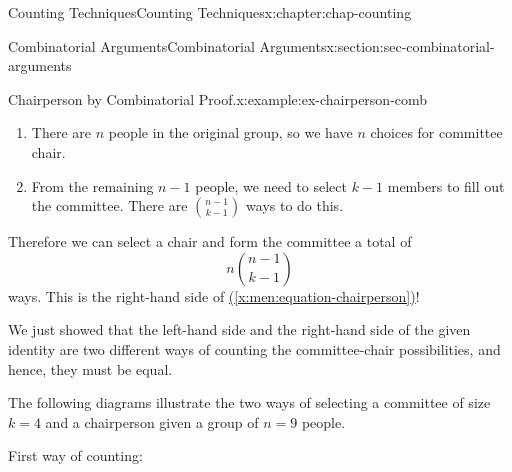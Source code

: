 \documentclass[oneside,10pt,]{book}
\newcommand{\xreffont}{\relax}
\numberwithin{equation}{section}
\begin{document}
\begin{chapterptx}{Counting Techniques}{}{Counting Techniques}{}{}{x:chapter:chap-counting}
\begin{sectionptx}{Combinatorial Arguments}{}{Combinatorial Arguments}{}{}{x:section:sec-combinatorial-arguments}
\begin{example}{Chairperson by Combinatorial Proof.}{x:example:ex-chairperson-comb}
\begin{enumerate}
\item{}There are \(n\) people in the original group, so we have \(n\) choices for committee chair.%
\item{}From the remaining \(n-1\) people, we need to select \(k-1\) members to fill out the committee. There are \(\binom{n-1}{k-1}\) ways to do this.%
\end{enumerate}
Therefore we can select a chair and form the committee a total of%
\begin{equation*}
n\binom{n-1}{k-1}
\end{equation*}
ways. This is the right-hand side of \hyperref[x:men:equation-chairperson]{({\xreffont\ref{x:men:equation-chairperson}})}!%
\par
We just showed that the left-hand side and the right-hand side of the given identity are two different ways of counting the committee-chair possibilities, and hence, they must be equal.%
\end{example}
The following diagrams illustrate the two ways of selecting a committee of size \(k = 4\) and a chairperson given a group of \(n = 9\) people.%
\par
First way of counting:%
\begin{sidebyside}{3}{0.085}{0.085}{0.17}%
\begin{sbspanel}{0.15}%
%
\end{sbspanel}%
\begin{sbspanel}{0.16}%
%
\end{sbspanel}%

\end{sidebyside}
\end{sectionptx}
\end{chapterptx}
\end{document}
